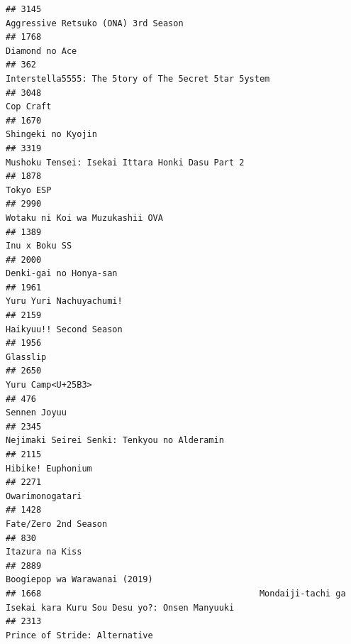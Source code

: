 \documentclass[
]{article}
\begin{document}
\begin{verbatim}
## 3145                                                                       Aggressive Retsuko (ONA) 3rd Season
## 1768                                                                                            Diamond no Ace
## 362                                                       Interstella5555: The 5tory of The 5ecret 5tar 5ystem
## 3048                                                                                                 Cop Craft
## 1670                                                                                        Shingeki no Kyojin
## 3319                                                           Mushoku Tensei: Isekai Ittara Honki Dasu Part 2
## 1878                                                                                                 Tokyo ESP
## 2990                                                                           Wotaku ni Koi wa Muzukashii OVA
## 1389                                                                                             Inu x Boku SS
## 2000                                                                                    Denki-gai no Honya-san
## 1961                                                                                   Yuru Yuri Nachuyachumi!
## 2159                                                                                   Haikyuu!! Second Season
## 1956                                                                                                  Glasslip
## 2650                                                                                         Yuru Camp<U+25B3>
## 476                                                                                               Sennen Joyuu
## 2345                                                               Nejimaki Seirei Senki: Tenkyou no Alderamin
## 2115                                                                                         Hibike! Euphonium
## 2271                                                                                           Owarimonogatari
## 1428                                                                                      Fate/Zero 2nd Season
## 830                                                                                            Itazura na Kiss
## 2889                                                                             Boogiepop wa Warawanai (2019)
## 1668                                           Mondaiji-tachi ga Isekai kara Kuru Sou Desu yo?: Onsen Manyuuki
## 2313                                                                             Prince of Stride: Alternative

\end{verbatim}
\end{document}

